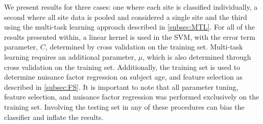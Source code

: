 \documentclass{llncs}
\begin{document}
We present results for three cases: one where each site is classified individually, a second where all site data is pooled and considered a single site and the third using the multi-task learning approach described in \ref{subsec:MTL}. For all of the results presented within, a linear kernel is used in the SVM, with the error term parameter, $C$,  determined by cross validation on the training set. Multi-task learning requires an additional parameter, $\mu$, which is also determined through cross validation on the training set. Additionally, the training set is used to determine nuisance factor regression on subject age, and feature selection as described in \ref{subsec:FS}. It is important to note that all parameter tuning, feature selection, and nuisance factor regression was performed exclusively on the training set. Involving the testing set in any of these procedures can bias the classifier and inflate the results.

\end{document}

